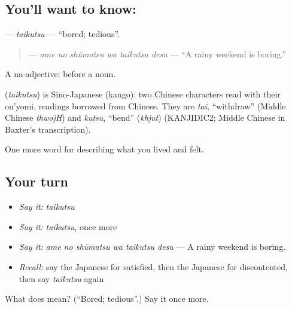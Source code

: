\subsection*{You'll want to know: }
\textbf{} — \emph{taikutsu} — \textquotedblleft{}bored; tedious\textquotedblright{}.

\begin{quote}
\textbf{  } — \emph{ame no shūmatsu wa taikutsu desu} — \textquotedblleft{}A rainy weekend is boring.\textquotedblright{}
\end{quote}

A na-adjective:  before a noun.

\begin{cousinweb}
\textbf{} (\emph{taikutsu}) is Sino-Japanese (kango): two Chinese characters read with their on'yomi, readings borrowed from Chinese. They are \emph{tai}, \textquotedblleft{}withdraw\textquotedblright{} (Middle Chinese \emph{thwojH}) and \emph{kutsu}, \textquotedblleft{}bend\textquotedblright{} (\emph{khjut}) (KANJIDIC2; Middle Chinese in Baxter's transcription).
\end{cousinweb}

\begin{grammarlens}[title={What you've built}]
One more word for describing what you lived and felt.
\end{grammarlens}

\subsection*{Your turn}
\begin{itemize}
\raggedright
  \item \emph{Say it:} \emph{taikutsu}
  \item \emph{Say it:} \emph{taikutsu}, once more
  \item \emph{Say it:} \emph{ame no shūmatsu wa taikutsu desu} — A rainy weekend is boring.
  \item \emph{Recall:} say the Japanese for satisfied, then the Japanese for discontented, then say \emph{taikutsu} again
\end{itemize}

\begin{tcolorbox}[breakable,colback=teal!4,colframe=teal!35!black,title={Before you move on}]
What does  mean? (\textquotedblleft{}Bored; tedious\textquotedblright{}.) Say it once more.
\end{tcolorbox}
